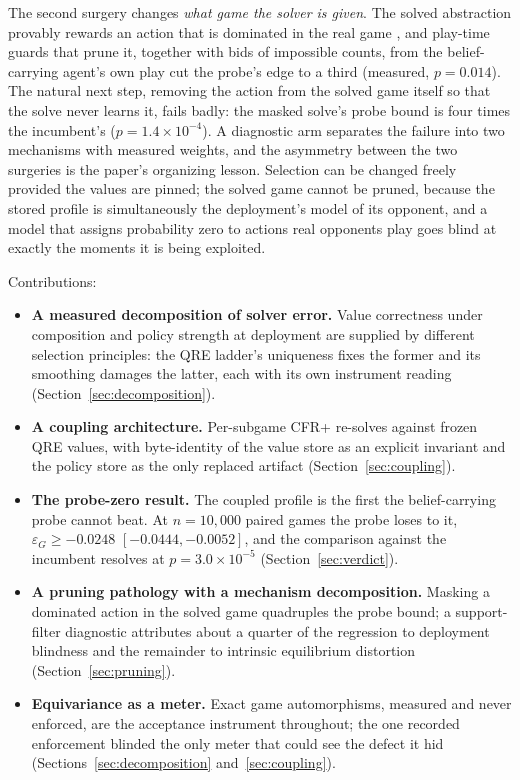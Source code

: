 \documentclass[11pt]{article}
\theoremstyle{plain}
\theoremstyle{definition}
\theoremstyle{remark}
\newcommand{\game}{\ensuremath{G}}
\newcommand{\epsG}{\ensuremath{\varepsilon_{\game}}}
\begin{document}
The second surgery changes \emph{what game the solver is given}. The
solved abstraction provably rewards an action that is dominated in the
real game \cite{rb2}, and play-time guards that prune it, together
with bids of impossible counts, from the belief-carrying agent's own
play cut the probe's edge to a third (measured, $p=0.014$). The natural next step, removing the action from the solved
game itself so that the solve never learns it, fails badly: the masked
solve's probe bound is four times the incumbent's
($p=1.4\times10^{-4}$). A diagnostic arm separates the failure into two
mechanisms with measured weights, and the asymmetry between the two
surgeries is the paper's organizing lesson. Selection can be changed
freely provided the values are pinned; the solved game cannot be pruned,
because the stored profile is simultaneously the deployment's model of
its opponent, and a model that assigns probability zero to actions real
opponents play goes blind at exactly the moments it is being exploited.

Contributions:

\begin{itemize}\itemsep3pt
  \item \textbf{A measured decomposition of solver error.} Value
        correctness under composition and policy strength at deployment
        are supplied by different selection principles: the QRE ladder's
        uniqueness fixes the former and its smoothing damages the
        latter, each with its own instrument reading
        (Section~\ref{sec:decomposition}).
  \item \textbf{A coupling architecture.} Per-subgame CFR+ re-solves
        against frozen QRE values, with byte-identity of the value store
        as an explicit invariant and the policy store as the only
        replaced artifact (Section~\ref{sec:coupling}).
  \item \textbf{The probe-zero result.} The coupled profile is the first
        the belief-carrying probe cannot beat. At $n=10{,}000$ paired
        games the probe loses to it, $\epsG \ge -0.0248$
        $[-0.0444,-0.0052]$, and the comparison against the incumbent
        resolves at $p=3.0\times10^{-5}$
        (Section~\ref{sec:verdict}).
  \item \textbf{A pruning pathology with a mechanism decomposition.}
        Masking a dominated action in the solved game quadruples the
        probe bound; a support-filter diagnostic attributes about a
        quarter of the regression to deployment blindness and the
        remainder to intrinsic equilibrium distortion
        (Section~\ref{sec:pruning}).
  \item \textbf{Equivariance as a meter.} Exact game automorphisms,
        measured and never enforced, are the acceptance instrument
        throughout; the one recorded enforcement blinded the only meter
        that could see the defect it hid
        (Sections~\ref{sec:decomposition} and~\ref{sec:coupling}).
\end{itemize}
\end{document}
